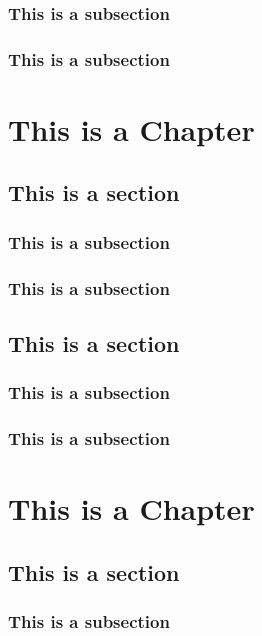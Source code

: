 \documentclass[11pt,oneside]{book}
\begin{document}
\subsection{This is a subsection}
\lipsum[1-1]
\subsection{This is a subsection}
\lipsum[1-2]



\chapter{This is a Chapter}
\section{This is a section}
\subsection{This is a subsection}
\lipsum[1-3]

\subsection{This is a subsection}
\lipsum[1-2]

\section{This is a section}
\subsection{This is a subsection}
\lipsum[1-1]
\subsection{This is a subsection}
\lipsum[1-2]

\chapter{This is a Chapter}
\section{This is a section}
\subsection{This is a subsection}
\lipsum[1-3]
\end{document}
